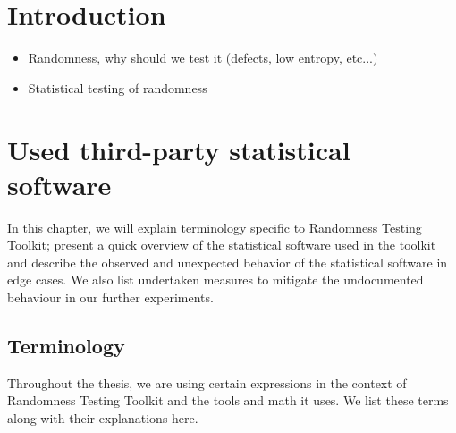 \documentclass[
  digital,  	%
  color,		%
  oneside,   	%
  12pt,
  nocover,
  notable,
  nolof,
  nolot,
]{fithesis3}
\begin{document}
\chapter{Introduction}
\begin{itemize}
\item Randomness, why should we test it (defects, low entropy, etc...)
\item Statistical testing of randomness
\end{itemize}

\chapter{Used third-party statistical software}
\label{chap:batteries}
In this chapter, we will explain terminology specific to Randomness Testing Toolkit; present a quick overview of the statistical software used in the toolkit and describe the observed and unexpected behavior of the statistical software in edge cases. We also list undertaken measures to mitigate the undocumented behaviour in our further experiments.

\section{Terminology}
Throughout the thesis, we are using certain expressions in the context of Randomness Testing Toolkit and the tools and math it uses. We list these terms along with their explanations here.
\end{document}
